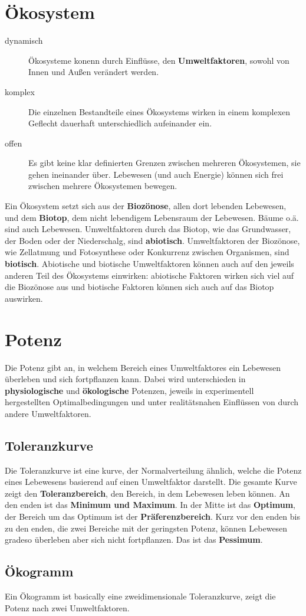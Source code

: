 \documentclass{article}
\begin{document}
\section{Ökosystem}  
\begin{description} 
\item[dynamisch] Ökosysteme konenn durch Einflüsse, den \textbf{Umweltfaktoren}, sowohl von Innen und Außen verändert werden. 
\item[komplex] Die einzelnen Bestandteile eines Ökosystems wirken in einem komplexen Geflecht dauerhaft unterschiedlich aufeinander ein.
\item[offen] Es gibt keine klar definierten Grenzen zwischen mehreren Ökosystemen, sie gehen ineinander über. Lebewesen (und auch Energie) können sich frei zwischen mehrere Ökosystemen bewegen.
\end{description} 
 
\noindent Ein Ökosystem setzt sich aus der \textbf{Biozönose}, allen dort lebenden Lebewesen, und dem \textbf{Biotop}, dem nicht lebendigem Lebensraum der Lebewesen. Bäume o.ä. sind auch Lebewesen. \newline
Umweltfaktoren durch das Biotop, wie das Grundwasser, der Boden oder der Niederschalg, sind \textbf{abiotisch}. Umweltfaktoren der Biozönose, wie Zellatmung und Fotosynthese oder Konkurrenz zwischen Organismen, sind \textbf{biotisch}. Abiotische und biotische Umweltfaktoren können auch auf den jeweils anderen Teil des Ökosystems einwirken: abiotische Faktoren wirken sich viel auf die Biozönose aus und biotische Faktoren können sich auch auf das Biotop auswirken.
 
\section{Potenz} 
Die Potenz gibt an, in welchem Bereich eines Umweltfaktores ein Lebewesen überleben und sich fortpflanzen kann. Dabei wird unterschieden in \textbf{physiologische} und \textbf{ökologische} Potenzen, jeweils in experimentell hergestellten Optimalbedingungen und unter realitätsnahen Einflüssen von durch andere Umweltfaktoren.
 
\subsection{Toleranzkurve}
Die Toleranzkurve ist eine kurve, der Normalverteilung ähnlich, welche die Potenz eines Lebewesens basierend auf einen Umweltfaktor darstellt. Die gesamte Kurve zeigt den \textbf{Toleranzbereich}, den Bereich, in dem Lebewesen leben können. An den enden ist das \textbf{Minimum und Maximum}. In der Mitte ist das \textbf{Optimum}, der Bereich um das Optimum ist der \textbf{Präferenzbereich}. Kurz vor den enden bis zu den enden, die zwei Bereiche mit der geringsten Potenz, können Lebewesen gradeso überleben aber sich nicht fortpflanzen. Das ist das \textbf{Pessimum}.
 
\subsection{Ökogramm}
Ein Ökogramm ist basically eine zweidimensionale Toleranzkurve, zeigt die Potenz nach zwei Umweltfaktoren.
 
\end{document}
